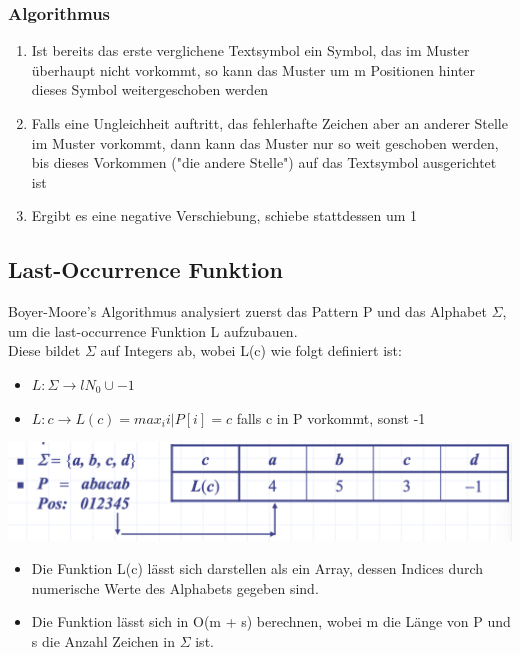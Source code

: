 \subsubsection{Algorithmus}
\begin{enumerate}
    \item Ist bereits das erste verglichene Textsymbol ein Symbol, das im Muster überhaupt nicht vorkommt, so kann das Muster um m Positionen hinter dieses Symbol weitergeschoben werden
    \item Falls eine Ungleichheit auftritt, das fehlerhafte Zeichen aber an anderer Stelle im Muster vorkommt, dann kann das Muster nur so weit geschoben werden, bis dieses Vorkommen ("die andere Stelle") auf das Textsymbol ausgerichtet ist
    \item Ergibt es eine negative Verschiebung, schiebe stattdessen um 1
\end{enumerate}
\subsection{Last-Occurrence Funktion}
Boyer-Moore's Algorithmus analysiert zuerst das Pattern P und das Alphabet $\Sigma$, um die last-occurrence Funktion L aufzubauen.\\
Diese bildet $\Sigma$ auf Integers ab, wobei L(c) wie folgt definiert ist:
\begin{itemize}
    \item $ L: \Sigma \rightarrow lN_0 \cup {-1}$
    \item $L: c \rightarrow L(c) =max_i {i|P[i]=c}$ falls c in P vorkommt, sonst -1
\end{itemize}
\begin{center}
    \includegraphics[scale=.28]{graphic/08 PatternMatching/Last-Occurrence.png}
\end{center}
\begin{itemize}
    \item Die Funktion L(c) lässt sich darstellen als ein Array, dessen Indices durch numerische Werte des Alphabets gegeben sind.
    \item Die Funktion lässt sich in O(m + s) berechnen, wobei m die Länge von P und s die Anzahl Zeichen in $\Sigma$ ist.
\end{itemize}

